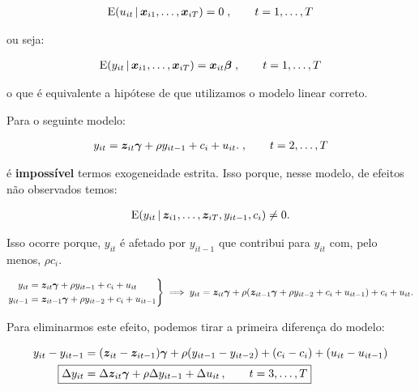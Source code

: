 \documentclass[11pt, oneside, a4paper, article]{article}
\numberwithin{equation}{section}
\begin{document}
\begin{description}
	\vspace{-1 em}
	\begin{align*}
		\text{E}( u_{it} \, | \, \boldsymbol{x}_{i1}, \dots, \boldsymbol{x}_{iT} ) = 0 \; , \qquad t = 1, \dots, T
	\end{align*}

	\noindent
	ou seja:

	\vspace{-1 em}
	\begin{align*}
		\text{E}( y_{it} \, | \, \boldsymbol{x}_{i1}, \dots, \boldsymbol{x}_{iT} ) = \boldsymbol{x}_{it} \boldsymbol{\beta} 
		\; , \qquad t = 1, \dots, T
	\end{align*}

	\noindent
	o que é equivalente a hipótese de que utilizamos o modelo linear correto.

	Para o seguinte modelo:

	\vspace{-1.5 em}
	\begin{align*}
		y_{it} = \boldsymbol{z}_{it} \boldsymbol{\gamma} + \rho y_{i t - 1} + c_{i} + u_{it}.
		\; , \qquad t = 2, \dots, T
	\end{align*}

	\noindent
	é \textbf{impossível} termos exogeneidade estrita.
	Isso porque, nesse modelo, de efeitos não observados temos:

	\vspace{-1.5 em}
	\begin{align*}
		\text{E}( y_{it} \, | \, \boldsymbol{z}_{i1}, \dots, \boldsymbol{z}_{iT}, y_{it-1}, c_{i}) \neq 0.
	\end{align*}

	\noindent
	Isso ocorre porque, $y_{it}$ é afetado por $y_{it-1}$ que contribui para $y_{it}$ com, pelo menos, $\rho c_{i}$.

	\begin{equation*}
		\left.
			\begin{aligned}
				y_{it} &= \boldsymbol{z}_{it} \boldsymbol{\gamma} + \rho y_{i t - 1} + c_{i} + u_{it}
				\\
				y_{it-1} &= \boldsymbol{z}_{it-1} \boldsymbol{\gamma} + \rho y_{i t - 2} + c_{i} + u_{it-1}
			\end{aligned}
		\right\} 
		\implies
		y_{it} = \boldsymbol{z}_{it} \boldsymbol{\gamma} +
		\rho (\boldsymbol{z}_{it-1} \boldsymbol{\gamma} + \rho y_{i t - 2} + c_{i} + u_{it-1})
		+ c_{i} + u_{it}.
	\end{equation*}

	Para eliminarmos este efeito, podemos tirar a primeira diferença do modelo:

	\vspace{-1 em}
	\begin{align}
		\nonumber
		y_{it} - y_{it-1} &= 
		(\mbs{z}_{it} - \mbs{z}_{it-1}) \mbs{\gamma} +
		\rho (y_{i t - 1} -  y_{i t - 2} ) +
		(c_{i} - c_{i}) + (u_{it} - u_{it-1})
		\\
		\label{mod1:FDIV}
		\Aboxed{
			\Delta y_{it} &= 
			\Delta \mbs{z}_{it} \mbs{\gamma} + \rho \Delta y_{i t - 1} + \Delta u_{it}
		\, , \qquad t=3, \dots, T}
	\end{align}


\end{description}
\end{document}
